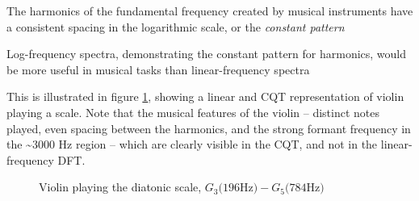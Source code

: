 \documentclass[letter,12pt,notitlepage]{article}
\newenvironment{tight_itemize}{
\begin{itemize}
  \setlength{\itemsep}{0pt}
  \setlength{\parskip}{0pt}
}{\end{itemize}}
\begin{document}
\begin{tight_itemize}
	\item
		The harmonics of the fundamental frequency created by musical instruments have a consistent spacing in the logarithmic scale, or the \textit{constant pattern}
	\item
		Log-frequency spectra, demonstrating the constant pattern for harmonics, would be more useful in musical tasks than linear-frequency spectra
\end{tight_itemize}

This is illustrated in figure \ref{fig:violin}, showing a linear and CQT representation of violin playing a scale. Note that the musical features of the violin -- distinct notes played, even spacing between the harmonics, and the strong formant frequency in the \textasciitilde3000 Hz region -- which are clearly visible in the CQT, and not in the linear-frequency DFT.

\begin{figure}[ht]
	\centering
	\hspace{0.5em}
	\caption{Violin playing the diatonic scale, $G_{3} \text{(196Hz)} - G_{5} \text{(784Hz)}$}
	\label{fig:violin}
\end{figure}

\end{document}
